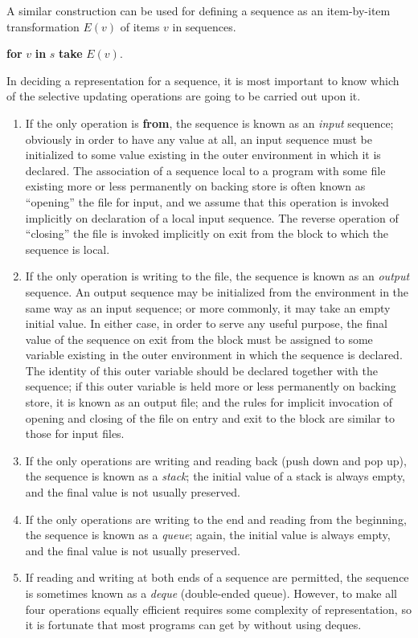 A similar construction can be used for defining a sequence as an item-by-item transformation $E(v)$ of items $v$ in sequences.

\quad \textbf{for} $v$ \textbf{in} $s$ \textbf{take} $E(v)$.

In deciding a representation for a sequence, it is most important to know which of the selective updating operations are going to be carried out upon it.

\begin{enumerate}[wide, nosep, label=(\arabic*)]
	\item If the only operation is \textbf{from}, the sequence is known as an \textit{input} sequence; obviously in order to have any value at all, an input sequence must be initialized to some value existing in the outer environment in which it is declared. The association of a sequence local to a program with some file existing more or less permanently on backing store is often known as ``opening'' the file for input, and we assume that this operation is invoked implicitly on declaration of a local input sequence. The reverse operation of ``closing'' the file is invoked implicitly on exit from the block to which the sequence is local.

	\item If the only operation is writing to the file, the sequence is known as an \textit{output} sequence. An output sequence may be initialized from the environment in the same way as an input sequence; or more commonly, it may take an empty initial value. In either case, in order to serve any useful purpose, the final value of the sequence on exit from the block must be assigned to some variable existing in the outer environment in which the sequence is declared. The identity of this outer variable should be declared together with the sequence; if this outer variable is held more or less permanently on backing store, it is known as an output file; and the rules for implicit invocation of opening and closing of the file on entry and exit to the block are similar to those for input files.

	\item If the only operations are writing and reading back (push down and 	pop up), the sequence is known as a \textit{stack}; the initial value of a stack is always empty, and the final value is not usually preserved. 

	\item If the only operations are writing to the end and reading from the beginning, the sequence is known as a \textit{queue}; again, the initial value is always empty, and the final value is not usually preserved.

	\item If reading and writing at both ends of a sequence are permitted, the sequence is sometimes known as a \textit{deque} (double-ended queue). However, to make all four operations equally efficient requires some complexity of representation, so it is fortunate that most programs can get by without using deques.
\end{enumerate}

